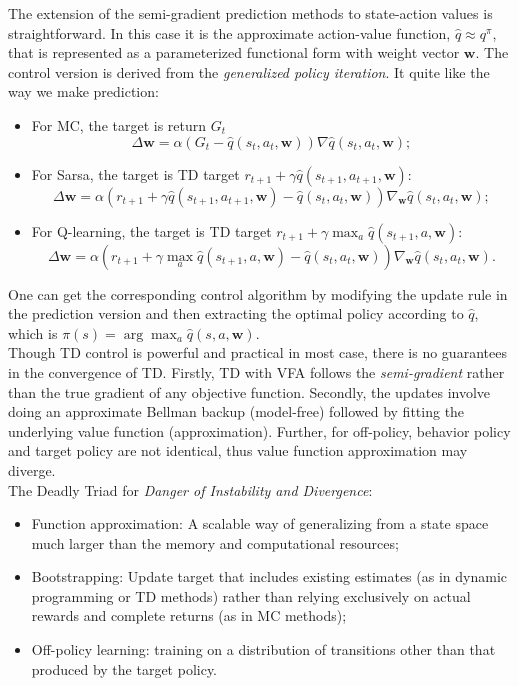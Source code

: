 \documentclass{progartcn}
\begin{document}
				The extension of the semi-gradient prediction methods to state-action values is straightforward. In this case it is the approximate action-value function, $\hat q\approx q^\pi$, that is represented as a parameterized functional form with weight vector $\bm{w}$. The control version is derived from the \textit{generalized policy iteration}. It quite like the way we make prediction:
				\begin{itemize}[noitemsep,topsep=0pt]
					\item For MC, the target is return $G_t$
						\[\Delta \bm{w}=\alpha(G_t-\hat{q}(s_t,a_t,\bm{w}))\nabla \hat{q}(s_t,a_t,\bm{w});\]
					\item For Sarsa, the target is TD target $r_{t+1}+\gamma\hat{q}(s_{t+1},a_{t+1},\bm{w})$:
						\[\Delta \mathbf{w}=\alpha\left(r_{t+1}+\gamma \hat{q}\left(s_{t+1}, a_{t+1}, \mathbf{w}\right)-\hat{q}\left(s_{t}, a_{t}, \mathbf{w}\right)\right) \nabla_{\mathbf{w}} \hat{q}\left(s_{t}, a_{t}, \mathbf{w}\right);\]
					\item For Q-learning, the target is TD target $r_{t+1}+\gamma \max _{a} \hat{q}\left(s_{t+1}, a, \mathbf{w}\right)$:
						\[\Delta \mathbf{w}=\alpha\left(r_{t+1}+\gamma \max _{a} \hat{q}\left(s_{t+1}, a, \mathbf{w}\right)-\hat{q}\left(s_{t}, a_{t}, \mathbf{w}\right)\right) \nabla_{\mathbf{w}} \hat{q}\left(s_{t}, a_{t}, \mathbf{w}\right).\]
				\end{itemize}

				One can get the corresponding control algorithm by modifying the update rule in the prediction version and then extracting the optimal policy according to $\hat{q}$, which is $\pi(s)=\arg\max_a \hat{q}(s,a,\bm{w})$.\\

	            Though TD control is powerful and practical in most case, there is no guarantees in the convergence of TD. Firstly, TD with VFA follows the \textit{semi-gradient} rather than the true gradient of any objective function. Secondly, the updates involve doing an approximate Bellman backup (model-free) followed by fitting the underlying value function (approximation). Further, for off-policy, behavior policy and target policy are not identical, thus value function approximation may diverge.\\

	            The Deadly Triad for \textit{Danger of Instability and Divergence}:
	            \begin{itemize}[noitemsep,topsep=0pt]
	            	\item Function approximation: A scalable way of generalizing from a state space much larger than the memory and computational resources;
					\item Bootstrapping: Update target that includes existing estimates (as in dynamic programming or TD methods) rather than relying exclusively on actual rewards and complete returns (as in MC methods);
					\item Off-policy learning: training on a distribution of transitions other than that produced by the target policy.\\
	        	\end{itemize}
\end{document}
